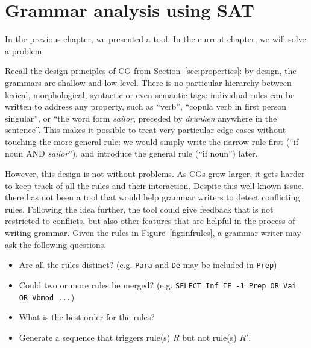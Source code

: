 \chapter{Grammar analysis using SAT}
\label{chapterCGana}


In the previous chapter, we presented a tool.
In the current chapter, we will solve a problem.




Recall the design principles of CG from Section~\ref{sec:properties}: 
by design, the grammars are shallow and low-level.
There is no particular hierarchy between lexical, morphological,
syntactic or even semantic tags: individual rules can be written to address any
property, such as ``verb'', ``copula verb in first person singular'',
or ``the word form \emph{sailor}, preceded by \emph{drunken} anywhere in the
sentence''. This makes it possible to treat very particular edge
cases without touching the more general rule: we would simply write
the narrow rule first (``if noun AND \emph{sailor}''), and introduce
the general rule (``if noun'') later.


However, this design is not without problems. As CGs grow larger, it
gets harder to keep track of all the rules and their interaction.
Despite this well-known issue, there has not been a tool that would help 
grammar writers to detect conflicting rules.
Following the idea further, the tool could give feedback that is not 
restricted to conflicts, but also other features that are helpful 
in the process of writing grammar.
Given the rules in Figure~\ref{fig:infrules}, a grammar writer may 
ask the following questions.



\begin{itemize}
\item Are all the rules distinct? (e.g. \texttt{Para} and \texttt{De} may be included in \texttt{Prep})
\item Could two or more rules be merged? (e.g. \texttt{SELECT Inf IF -1 Prep OR Vai OR Vbmod ...})
\item What is the best order for the rules?
\item Generate a sequence that triggers rule(s) $R$ but not rule(s) $R'$. 
\end{itemize}



